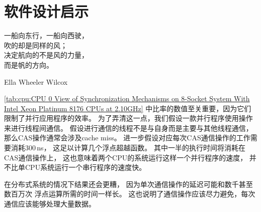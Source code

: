 
\section{软件设计启示}
\label{sec:cpu:Software Design Implications}
%
\epigraph{一船向东行，一船向西驶，\\
	  吹的却是同样的风；\\
	  决定航向的不是风的力量，\\
	  而是帆的方向。}
	 {Ella Wheeler Wilcox}

\cref{tab:cpu:CPU 0 View of Synchronization Mechanisms on 8-Socket System With Intel Xeon Platinum 8176 CPUs at 2.10GHz}
中比率的数值至关重要，因为它们限制了并行应用程序的效率。
为了弄清这一点，我们假设一款并行程序使用操作来进行线程间通信。
假设进行通信的线程不是与自身而是主要与其他线程通信，
那么CAS操作通常会涉及cache miss。
进一步假设对应每次CAS通信操作的工作需要消耗300\,ns，
这足以计算几个浮点超越函数。
其中一半的执行时间将消耗在CAS通信操作上，
这也意味着两个CPU的系统运行这样一个并行程序的速度，
并不比单CPU系统运行一个串行程序的速度快。

在分布式系统的情况下结果还会更糟，
因为单次通信操作的延迟可能和数千甚至数百万次
浮点运算所需的时间一样长。
这也说明了通信操作应该尽力避免，每次通信应该能够处理大量数据。

